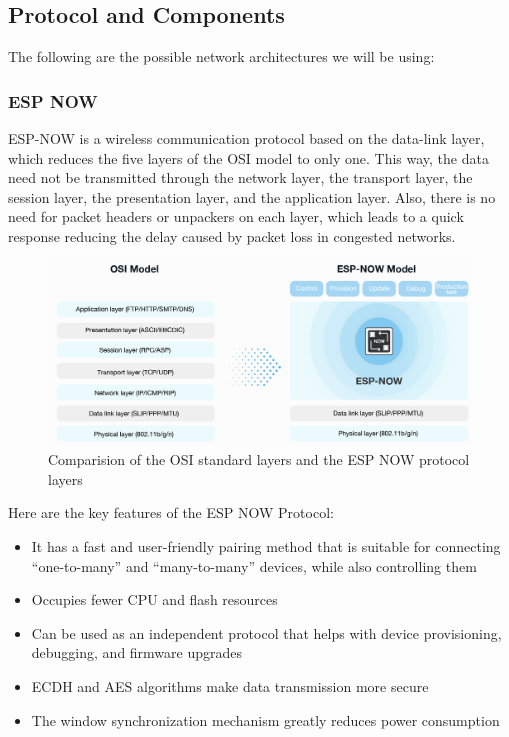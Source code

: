 \subsection{Protocol and Components}
The following are the possible network architectures we will be using:
\subsubsection{ESP NOW}
ESP-NOW is a wireless communication protocol based on the data-link layer, which reduces the five layers of the OSI model to only one. This way, the data need not be transmitted through the network layer, the transport layer, the session layer, the presentation layer, and the application layer. Also, there is no need for packet headers or unpackers on each layer, which leads to a quick response reducing the delay caused by packet loss in congested networks. 
\begin{figure}[H]
    \centering
    \includegraphics[width=0.75\linewidth]{Files/Images/model-en.png}
    \caption{Comparision of the OSI standard layers and the ESP NOW protocol layers}
    \label{fig:enter-label}
\end{figure}
Here are the key features of the ESP NOW Protocol:
\begin{itemize}
    \item It has a fast and user-friendly pairing method that is suitable for connecting “one-to-many” and “many-to-many” devices, while also controlling them
    \item Occupies fewer CPU and flash resources
    \item Can be used as an independent protocol that helps with device provisioning, debugging, and firmware upgrades
    \item  ECDH and AES algorithms make data transmission more secure
    \item The window synchronization mechanism greatly reduces power consumption
\end{itemize}
